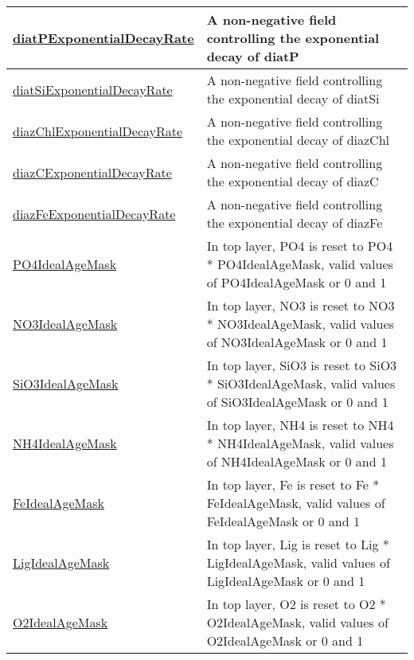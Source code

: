 {\begin{center}
\begin{longtable}{| p{2.0in} | p{4.0in} |}
    \hline
    \hyperref[subsec:var_sec_forcing_diatPExponentialDecayRate]{diatPExponentialDecayRate} & A non-negative field controlling the exponential decay of diatP \\
    \hline
    \hyperref[subsec:var_sec_forcing_diatSiExponentialDecayRate]{diatSiExponentialDecayRate} & A non-negative field controlling the exponential decay of diatSi \\
    \hline
    \hyperref[subsec:var_sec_forcing_diazChlExponentialDecayRate]{diazChlExponentialDecayRate} & A non-negative field controlling the exponential decay of diazChl \\
    \hline
    \hyperref[subsec:var_sec_forcing_diazCExponentialDecayRate]{diazCExponentialDecayRate} & A non-negative field controlling the exponential decay of diazC \\
    \hline
    \hyperref[subsec:var_sec_forcing_diazFeExponentialDecayRate]{diazFeExponentialDecayRate} & A non-negative field controlling the exponential decay of diazFe \\
    \hline
    \hyperref[subsec:var_sec_forcing_PO4IdealAgeMask]{PO4IdealAgeMask} & In top layer, PO4 is reset to PO4 * PO4IdealAgeMask, valid values of PO4IdealAgeMask or 0 and 1 \\
    \hline
    \hyperref[subsec:var_sec_forcing_NO3IdealAgeMask]{NO3IdealAgeMask} & In top layer, NO3 is reset to NO3 * NO3IdealAgeMask, valid values of NO3IdealAgeMask or 0 and 1 \\
    \hline
    \hyperref[subsec:var_sec_forcing_SiO3IdealAgeMask]{SiO3IdealAgeMask} & In top layer, SiO3 is reset to SiO3 * SiO3IdealAgeMask, valid values of SiO3IdealAgeMask or 0 and 1 \\
    \hline
    \hyperref[subsec:var_sec_forcing_NH4IdealAgeMask]{NH4IdealAgeMask} & In top layer, NH4 is reset to NH4 * NH4IdealAgeMask, valid values of NH4IdealAgeMask or 0 and 1 \\
    \hline
    \hyperref[subsec:var_sec_forcing_FeIdealAgeMask]{FeIdealAgeMask} & In top layer, Fe is reset to Fe * FeIdealAgeMask, valid values of FeIdealAgeMask or 0 and 1 \\
    \hline
    \hyperref[subsec:var_sec_forcing_LigIdealAgeMask]{LigIdealAgeMask} & In top layer, Lig is reset to Lig * LigIdealAgeMask, valid values of LigIdealAgeMask or 0 and 1 \\
    \hline
    \hyperref[subsec:var_sec_forcing_O2IdealAgeMask]{O2IdealAgeMask} & In top layer, O2 is reset to O2 * O2IdealAgeMask, valid values of O2IdealAgeMask or 0 and 1 \\

\end{longtable}
\end{center}}
